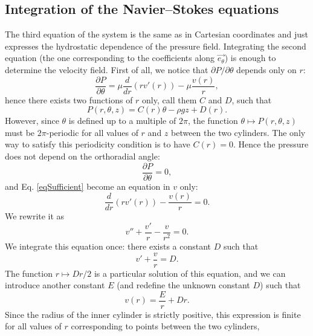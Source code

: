 \documentclass[DIV=12]{article}
\newcommand{\etheta}{\vec{e_\theta}}
\begin{document}
 \subsection{Integration of the Navier--Stokes equations}
 The third equation of the system is the same as in Cartesian coordinates and just expresses the hydrostatic dependence of the pressure 
 field. Integrating the second equation (the one corresponding to the coefficients along $\etheta$) is enough to determine the 
 velocity field. First of all, we notice that $\partial P / \partial \theta$ depends only on $r$:
\begin{equation}
\frac{\partial P}{ \partial \theta}  = \mu\frac{d}{dr}( r v'(r)) -\mu\frac{v(r)}{r},
 \label{eqSufficient}
\end{equation}
 hence there exists two functions of $r$ only, call them $C$ and $D$, such that
\begin{equation}
 P(r,\theta, z ) = C( r ) \theta -\rho g z + D(r ).
\end{equation}
 However, since $\theta$ is defined up to a multiple of $2\pi$, the function $\theta \mapsto P(r,\theta,z)$ must be
 $2\pi$-periodic for all values of $r$ and $z$ between the two cylinders. The only way to 
 satisfy this periodicity condition is to have $C(r) = 0$. Hence the pressure does not depend on the orthoradial
 angle:
\begin{equation}
\frac{\partial P}{\partial \theta} = 0,
\end{equation}
 and Eq. \ref{eqSufficient} become an equation in $v$ only:\\
\begin{equation}
\frac{d}{dr}( r v'(r)) - \frac{v(r)}{r}= 0.
\end{equation}
We rewrite it as
\begin{equation}
v'' + \frac{v'}{r}- \frac{v}{r^2} = 0.
\end{equation}
We integrate this equation once: there exists a constant $D$ such that
\begin{equation}
 v' +\frac{v}{r} = D.
\end{equation}
 The function $r\mapsto Dr/2$ is a particular solution of this equation, and we
 can introduce another constant $E$ (and redefine the unknown constant $D$) such that
\begin{equation}
 v( r ) = \frac{E}{r} + Dr.
\end{equation}
 Since the radius of the inner cylinder is strictly positive, this expression is finite
 for all values of $r$ corresponding to points between the two cylinders, 
\end{document}
